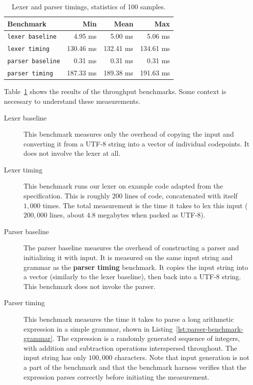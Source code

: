 \begin{table}[h]
	\centering
	\begin{tabular}{lrrr}
		\hline
		\textbf{Benchmark}         & Min       & \textbf{Mean} & Max \\
		\hline
		\texttt{lexer baseline}    & 4.95   ms & 5.00   ms & 5.06   ms \\
		\texttt{lexer timing}      & 130.46 ms & 132.41 ms & 134.61 ms \\
		\texttt{parser baseline}   & 0.31   ms & 0.31   ms & 0.31   ms \\
		\texttt{parser timing}     & 187.33 ms & 189.38 ms & 191.63 ms \\
		\hline
	\end{tabular}
	\caption{Lexer and parser timings, statistics of 100 samples.}
	\label{tab:throughput}
\end{table}

Table~\ref{tab:throughput} shows the results of the throughput benchmarks. Some
context is necessary to understand these measurements.

\begin{description}
	\item[Lexer baseline] This benchmark measures only the overhead of copying
		the input and converting it from a UTF-8 string into a vector of
		individual codepoints. It does not involve the lexer at all.
	\item[Lexer timing] This benchmark runs our lexer on example \pfs code
		adapted from the specification\cite{p416:v123:spec}. This is roughly
		\(200\) lines of code, concatenated with itself \(1,000\) times. The
		total measurement is the time it takes to lex this input (\(200,000\)
		lines, about \(4.8\) megabytes when packed as UTF-8).
	\item[Parser baseline] The parser baseline measures the overhead of
		constructing a parser and initializing it with input. It is measured on
		the same input string and grammar as the \textbf{parser timing}
		benchmark. It copies the input string into a vector (similarly to the
		lexer baseline), then back into a UTF-8 string. This benchmark does not
		invoke the parser.
	\item[Parser timing] This benchmark measures the time it takes to parse a
		long arithmetic expression in a simple grammar, shown in
		Listing~\ref{lst:parser-benchmark-grammar}. The expression is a randomly
		generated sequence of integers, with addition and subtraction operations
		interspersed throughout. The input string has only \(100,000\)
		characters. Note that input generation is not a part of the benchmark
		and that the benchmark harness verifies that the expression parses
		correctly before initiating the measurement.
\end{description}

